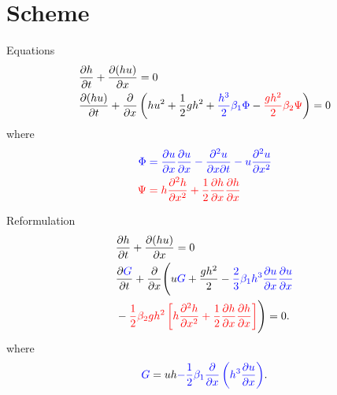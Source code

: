 \documentclass[pdf]{beamer}
\begin{document}
\section{Scheme}
\begin{frame}{Equations}
\begin{align*}
&\dfrac{\partial h}{\partial t} + \dfrac{\partial (hu)}{\partial x} = 0\\
&\dfrac{\partial (hu)}{\partial t} + \dfrac{\partial }{\partial x} \left( hu^2 + \frac{1}{2}gh^2  +  {\color{blue} \frac{h^3}{2}\beta_1 \Phi } -   {\color{red} \frac{gh^2}{2} \beta_2 \Psi}  \right)= 0 \\
\end{align*}
where
\begin{align*}
\color{blue} \Phi  & \color{blue}= \frac{\partial u}{\partial x}\frac{\partial u}{\partial x} - \frac{\partial^2 u}{\partial x \partial t} - u\frac{\partial^2 u}{\partial x^2} \\
\color{red} \Psi & \color{red}= h \frac{\partial^2 h}{\partial x^2} + \frac{1}{2} \frac{\partial h}{\partial x}\frac{\partial h}{\partial x} 
\end{align*}
\end{frame}

\begin{frame}{Reformulation}
\begin{align*}
&\dfrac{\partial h}{\partial t} + \dfrac{\partial (hu)}{\partial x} = 0\\
&\dfrac{\partial {\color{blue} G} }{\partial t}  + \dfrac{\partial}{\partial x} \Bigg( u{\color{blue} G} + \dfrac{gh^2}{2} - {\color{blue} \frac{2}{3} \beta_1 h^3\dfrac{\partial u}{\partial x}\dfrac{\partial u}{\partial x} } \\ &- {\color{red}\frac{1}{2} \beta_2 g h^2  \left[h\frac{\partial^2 h}{\partial x^2} +   \frac{1}{2}\frac{\partial h}{\partial x}\frac{\partial h}{\partial x}\right] } \Bigg) = 0.
\end{align*}
where
\begin{gather*}
{\color{blue} G} = uh {\color{blue} - \frac{1}{2} \beta_1\dfrac{\partial }{\partial x} \left ( h^3 \dfrac{\partial u}{\partial x} \right )}.
\end{gather*}
\end{frame}
\end{document}
